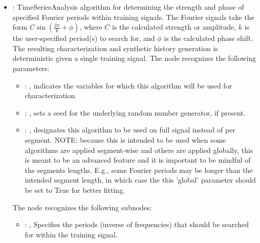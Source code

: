 \begin{itemize}
    \item {}:
      TimeSeriesAnalysis algorithm for determining the strength and phase of
      specified Fourier periods within training signals. The Fourier signals take
      the form $C\sin(\frac{2\pi}{k}+\phi)$, where $C$ is the calculated strength
      or amplitude, $k$ is the user-specified period(s) to search for, and $\phi$
      is the calculated phase shift. The resulting characterization and synthetic
      history generation is deterministic given a single training signal.
      The  node recognizes the following parameters:
        \begin{itemize}
          \item {}: , 
            indicates the variables for which this algorithm will be used for characterization.
          \item {}: , 
            sets a seed for the underlying random number generator, if present.
          \item {}: , 
            designates this algorithm to be used on full signal instead of per
            segment. NOTE: because this is intended to be used when some algorithms are
            applied segment-wise and others are applied globally, this is meant to be an
            advanced feature and it is important to be mindful of the segments lengths.
            E.g., some Fourier periods may be longer than the intended segment length, in
            which case the this 'global' parameter should be set to True for better
            fitting. 
      \end{itemize}

      The  node recognizes the following subnodes:
      \begin{itemize}
        \item {}: , 
          Specifies the periods (inverse of frequencies) that should be searched
          for within the training signal.
      \end{itemize}


\end{itemize}
